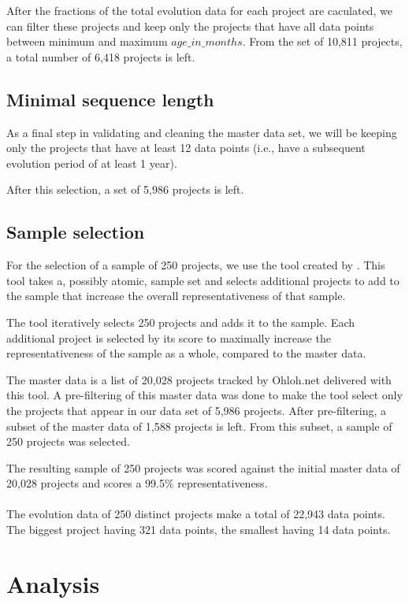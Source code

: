 After the fractions of the total evolution data for each project are caculated,
we can filter these projects and keep only the projects that have all data points
between minimum and maximum $age\_in\_months$. From the set of 10,811 projects,
a total number of 6,418 projects is left.

\subsection{Minimal sequence length}
As a final step in validating and cleaning the master data set, we will be
keeping only the projects that have at least 12 data points (i.e., have a
subsequent evolution period of at least 1 year).

After this selection, a set of 5,986 projects is left.

\subsection{Sample selection}
For the selection of a sample of 250 projects, we use the tool created by
\citet{nagappan}. This tool takes a, possibly atomic, sample set and selects
additional projects to add to the sample that increase the overall
representativeness of that sample.

The tool iteratively selects 250 projects and adds it to the sample. Each
additional project is selected by its score to maximally increase the
representativeness of the sample as a whole, compared to the master data.

The master data is a list of 20,028 projects tracked by Ohloh.net delivered with
this tool. A pre-filtering of this master data was done to make the tool select
only the projects that appear in our data set of 5,986 projects. After
pre-filtering, a subset of the master data of 1,588 projects is left. From this
subset, a sample of 250 projects was selected.

The resulting sample of 250 projects was scored against the initial master data
of 20,028 projects and scores a 99.5\% representativeness.

\paragraph{}
The evolution data of 250 distinct projects make a total of 22,943 data points.
The biggest project having 321 data points, the smallest having 14 data points.

\section{Analysis}

